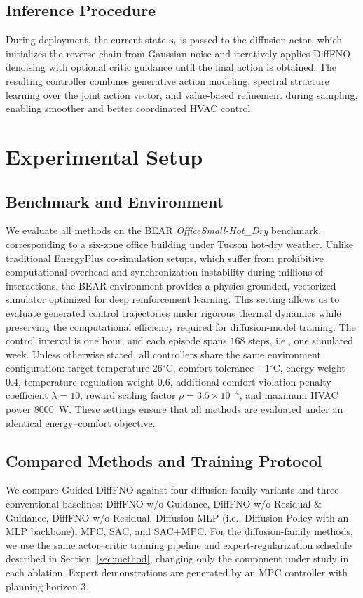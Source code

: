 \documentclass[lettersize,journal]{IEEEtran}
\theoremstyle{nonumberplain}     \theoremheaderfont{\bfseries\itshape}     \theorembodyfont{\normalfont}     \theoremseparator{:}     \theoremsymbol{\ensuremath{\blacksquare}}     \newtheorem{proof}{Proof}
\theoremstyle{plain}     \theoremheaderfont{\bfseries\itshape}     \theorembodyfont{\normalfont}     \theoremseparator{:}     \theoremsymbol{\ensuremath{\blacksquare}}     \newtheorem{remark}{Remark}
\begin{document}
\subsection{Inference Procedure}

During deployment, the current state $\mathbf{s}_t$ is passed to the diffusion actor, which initializes the reverse chain from Gaussian noise and iteratively applies DiffFNO denoising with optional critic guidance until the final action is obtained. The resulting controller combines generative action modeling, spectral structure learning over the joint action vector, and value-based refinement during sampling, enabling smoother and better coordinated HVAC control.




\section{Experimental Setup}
\label{sec:Experimental Setup}

\subsection{Benchmark and Environment}
We evaluate all methods on the BEAR \emph{OfficeSmall-Hot\_Dry} benchmark, corresponding to a six-zone office building under Tucson hot-dry weather. Unlike traditional EnergyPlus co-simulation setups, which suffer from prohibitive computational overhead and synchronization instability during millions of interactions, the BEAR environment provides a physics-grounded, vectorized simulator optimized for deep reinforcement learning. This setting allows us to evaluate generated control trajectories under rigorous thermal dynamics while preserving the computational efficiency required for diffusion-model training. The control interval is one hour, and each episode spans $168$ steps, i.e., one simulated week. Unless otherwise stated, all controllers share the same environment configuration: target temperature $26^\circ$C, comfort tolerance $\pm 1^\circ$C, energy weight $0.4$, temperature-regulation weight $0.6$, additional comfort-violation penalty coefficient $\lambda=10$, reward scaling factor $\rho=3.5\times 10^{-4}$, and maximum HVAC power $8000$~W. These settings ensure that all methods are evaluated under an identical energy--comfort objective.

\subsection{Compared Methods and Training Protocol}
We compare Guided-DiffFNO against four diffusion-family variants and three conventional baselines: DiffFNO w/o Guidance, DiffFNO w/o Residual \& Guidance, DiffFNO w/o Residual, Diffusion-MLP (i.e., Diffusion Policy with an MLP backbone), MPC, SAC\cite{haarnoja2018soft}, and SAC+MPC. For the diffusion-family methods, we use the same actor--critic training pipeline and expert-regularization schedule described in Section~\ref{sec:method}, changing only the component under study in each ablation. Expert demonstrations are generated by an MPC controller with planning horizon $3$.
\end{document}
